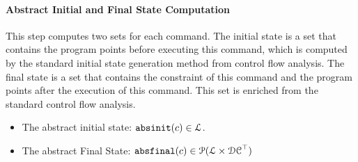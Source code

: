 \paragraph{Abstract Initial and Final State Computation}
This step computes two sets for each command. 
The initial state is a set that contains the
program points before executing this command, which is computed by the standard initial state generation method from control flow analysis.
The final state is a set
that contains the constraint of this command and the program points after the execution of this command.
This set is enriched 
from the standard control flow analysis.

%
\begin{itemize}
\item The abstract initial state: $\mathtt{abs}{\mathtt{init}}(c) \in \mathcal{L}$.
%
\item The abstract Final State: $\mathtt{abs}{\mathtt{final}}(c) \in \mathcal{P}(\mathcal{L} \times \mathcal{DC}^{\top})$
\end{itemize}

